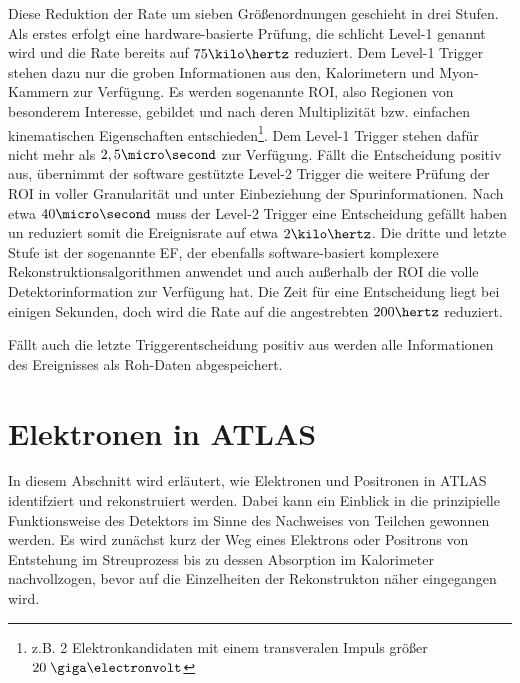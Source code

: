 Diese Reduktion der Rate um sieben Größenordnungen geschieht in drei Stufen.
Als erstes erfolgt eine hardware-basierte Prüfung, die schlicht Level-1 genannt
wird und die Rate bereits auf $75\kilo\hertz$ reduziert. Dem Level-1 Trigger
stehen dazu nur die groben Informationen aus den, Kalorimetern und Myon-Kammern
zur Verfügung. Es werden sogenannte \acf{ROI}, also Regionen von besonderem
Interesse, gebildet und nach deren Multiplizität bzw. einfachen kinematischen
Eigenschaften entschieden\footnote{z.B. 2 Elektronkandidaten mit einem
transveralen Impuls größer $20\GeV$}. Dem Level-1 Trigger stehen dafür nicht
mehr als $2,5\micro\second$ zur Verfügung. Fällt die Entscheidung positiv aus,
übernimmt der software gestützte Level-2 Trigger die weitere Prüfung der
\ac{ROI} in voller Granularität und unter Einbeziehung der Spurinformationen.
Nach etwa $40\micro\second$ muss der Level-2 Trigger eine Entscheidung gefällt
haben un reduziert somit die Ereignisrate auf etwa $2\kilo\hertz$. Die dritte
und letzte Stufe ist der sogenannte \acf{EF}, der ebenfalls software-basiert
komplexere Rekonstruktionsalgorithmen anwendet und auch außerhalb der \ac{ROI}
die volle Detektorinformation zur Verfügung hat. Die Zeit für eine Entscheidung
liegt bei einigen Sekunden, doch wird die Rate auf die angestrebten $200\hertz$
reduziert.

Fällt auch die letzte Triggerentscheidung positiv aus werden alle Informationen
des Ereignisses als Roh-Daten abgespeichert.



%
\section{Elektronen in ATLAS}
\label{electrons}

In diesem Abschnitt wird erläutert, wie Elektronen und Positronen in ATLAS
identifziert und rekonstruiert werden. Dabei kann ein Einblick in die
prinzipielle Funktionsweise des Detektors im Sinne des Nachweises von Teilchen
gewonnen werden. Es wird zunächst kurz der Weg eines Elektrons oder Positrons
von Entstehung im Streuprozess bis zu dessen Absorption im Kalorimeter
nachvollzogen, bevor auf die Einzelheiten der Rekonstrukton näher eingegangen
wird.

